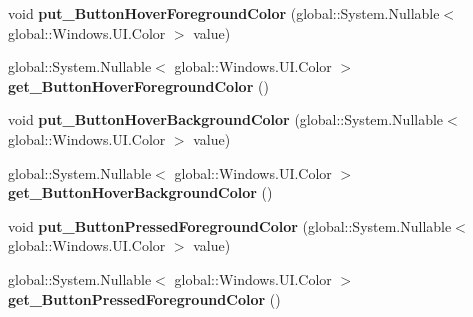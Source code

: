 \begin{DoxyCompactItemize}
\item 
\mbox{\label{class_windows_1_1_u_i_1_1_view_management_1_1_application_view_title_bar_a81367f4399734083a0312e932602d91a}} 
void {\bfseries put\+\_\+\+Button\+Hover\+Foreground\+Color} (global\+::\+System.\+Nullable$<$ global\+::\+Windows.\+U\+I.\+Color $>$ value)
\item 
\mbox{\label{class_windows_1_1_u_i_1_1_view_management_1_1_application_view_title_bar_abb2bd226eff90e756e30fce411565e04}} 
global\+::\+System.\+Nullable$<$ global\+::\+Windows.\+U\+I.\+Color $>$ {\bfseries get\+\_\+\+Button\+Hover\+Foreground\+Color} ()
\item 
\mbox{\label{class_windows_1_1_u_i_1_1_view_management_1_1_application_view_title_bar_aab71134c8d012975419633c926f62d40}} 
void {\bfseries put\+\_\+\+Button\+Hover\+Background\+Color} (global\+::\+System.\+Nullable$<$ global\+::\+Windows.\+U\+I.\+Color $>$ value)
\item 
\mbox{\label{class_windows_1_1_u_i_1_1_view_management_1_1_application_view_title_bar_ad8730e54e00f186ed98dfd21d624e119}} 
global\+::\+System.\+Nullable$<$ global\+::\+Windows.\+U\+I.\+Color $>$ {\bfseries get\+\_\+\+Button\+Hover\+Background\+Color} ()
\item 
\mbox{\label{class_windows_1_1_u_i_1_1_view_management_1_1_application_view_title_bar_a435e7ae01a4b3ea59a80006b81279ccb}} 
void {\bfseries put\+\_\+\+Button\+Pressed\+Foreground\+Color} (global\+::\+System.\+Nullable$<$ global\+::\+Windows.\+U\+I.\+Color $>$ value)
\item 
\mbox{\label{class_windows_1_1_u_i_1_1_view_management_1_1_application_view_title_bar_a59124291680af5093b2aa92987f61c76}} 
global\+::\+System.\+Nullable$<$ global\+::\+Windows.\+U\+I.\+Color $>$ {\bfseries get\+\_\+\+Button\+Pressed\+Foreground\+Color} ()
\item 

\end{DoxyCompactItemize}
